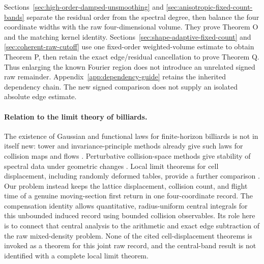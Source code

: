 \documentclass[11pt,reqno]{amsart}
\numberwithin{equation}{section}
\theoremstyle{definition}\newtheorem{definition}[theorem]{Definition}
\theoremstyle{remark}\newtheorem{remark}[theorem]{Remark}
\begin{document}
Sections~\ref{sec:high-order-damped-unsmoothing} and
\ref{sec:anisotropic-fixed-count-bands} separate the residual order from
the spectral degree, then balance the four coordinate widths with the
raw four-dimensional volume. They prove Theorem O and the matching
kernel identity. Sections~\ref{sec:shape-adaptive-fixed-count} and
\ref{sec:coherent-raw-cutoff} use one fixed-order weighted-volume
estimate to obtain Theorem P, then retain the exact edge/residual
cancellation to prove Theorem Q. Thus enlarging the known Fourier
region does not introduce an unrelated signed raw remainder.
Appendix~\ref{app:dependency-guide} retains the inherited dependency
chain. The new signed comparison does not supply an isolated
absolute edge estimate.

\paragraph{Relation to the limit theory of billiards.}
The existence of Gaussian and functional laws for finite-horizon
billiards is not in itself new: tower and invariance-principle methods
already give such laws for collision maps and flows
\cite{Young,MN}. Perturbative collision-space methods give stability of
spectral data under geometric changes \cite{DZ}. Local limit theorems
for cell displacement, including randomly deformed tables, provide a
further comparison \cite{SV,DPZ}. Our problem instead keeps the lattice
displacement, collision count, and flight time of a genuine moving-section
first return in one four-coordinate record. The compensation identity
allows quantitative, radius-uniform central integrals for this
unbounded induced record using bounded collision observables. Its role
here is to connect that central analysis to the arithmetic and exact
edge subtraction of the raw mixed-density problem. None of the cited
cell-displacement theorems is invoked as a theorem for this joint raw
record, and the central-band result is not identified with a complete
local limit theorem.


















\end{document}
